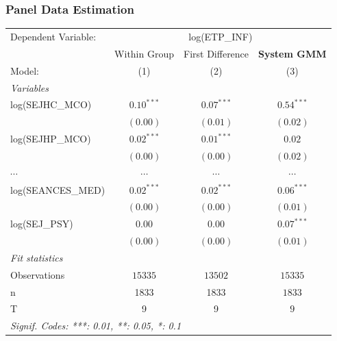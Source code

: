 \documentclass[10pt,mathserif]{beamer}
\begin{document}
\begin{frame}
  \frametitle{Panel Data Estimation}
  \begin{table}\fontsize{6pt}{8pt}\selectfont
    \begingroup
    \centering
    \begin{tabular}{lccc}
      \tabularnewline \midrule \midrule
      Dependent Variable: & \multicolumn{3}{c}{log(ETP\_INF)}                                          \\
                          & Within Group                      & First Difference & \textbf{System GMM} \\
      Model:              & (1)                               & (2)              & (3)                 \\
      \midrule
      \emph{Variables}                                                                                 \\
      log(SEJHC\_MCO)     & $0.10^{***}$                      & $0.07^{***}$     & $0.54^{***}$        \\
                          & $(0.00)$                          & $(0.01)$         & $(0.02)$            \\
      log(SEJHP\_MCO)     & $0.02^{***}$                      & $0.01^{***}$     & $0.02$              \\
                          & $(0.00)$                          & $(0.00)$         & $(0.02)$            \\
      $\cdots$            & $\cdots$                          & $\cdots$         & $\cdots$            \\
      log(SEANCES\_MED)   & $0.02^{***}$                      & $0.02^{***}$     & $0.06^{***}$        \\
                          & $(0.00)$                          & $(0.00)$         & $(0.01)$            \\

      log(SEJ\_PSY)       & $0.00$                            & $0.00$           & $0.07^{***}$        \\  & $(0.00)$ & $(0.00)$ &
      $(0.01)$                                                                                         \\ \midrule \emph{Fit statistics} \\ Observations & $15335$                     & $13502$
                          & $15335$                                                                    \\

      n                   & 1833                              & 1833             & $1833$              \\ T & 9 & 9 & $9$ \\ \midrule \midrule
      \multicolumn{4}{l}{\emph{Signif. Codes: ***: 0.01, **: 0.05, *: 0.1}}                            \\
    \end{tabular}
    \par\endgroup
  \end{table}
\end{frame}
\end{document}
